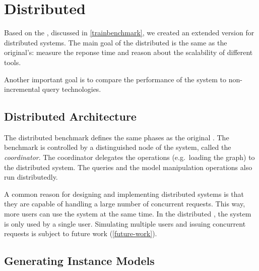 \section{Distributed \tb{}}
\label{distributed-trainbenchmark}


Based on the \tb{}, discussed in \autoref{trainbenchmark}, we created an extended version for distributed systems. The main goal of the distributed \tb{} is the same as the original's: measure the reponse time and reason about the scalability of different tools.

Another important goal is to compare the performance of the system to non-incremental query technologies.

\subsection{Distributed Architecture}

The distributed benchmark defines the same phases as the original \tb{}. The benchmark is controlled by a distinguished node of the system, called the \emph{coordinator}. The coordinator delegates the operations (e.g.\ loading the graph) to the distributed system. The queries and the model manipulation operations also run distributedly.


A common reason for designing and implementing distributed systems is that they are capable of handling a large number of concurrent requests. This way, more users can use the system at the same time. In the distributed \tb{}, the system is only used by a single user. Simulating multiple users and issuing concurrent requests is subject to future work (\autoref{future-work}).

\subsection{Generating Instance Models}

